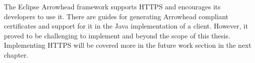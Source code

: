 The Eclipse Arrowhead framework supports HTTPS and encourages its developers to use it.
There are guides for generating Arrowhead compliant certificates and support for it in the Java implementation of a client.
However, it proved to be challenging to implement and beyond the scope of this thesis. 
Implementing HTTPS will be covered more in the future work section in the next chapter.